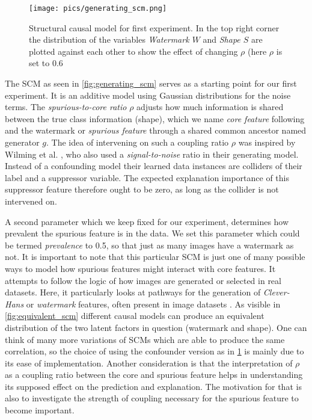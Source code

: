 \begin{figure}[H]
    \centering
    \texttt{[image: pics/generating\_scm.png]}
    \caption{Structural causal model for first experiment.
        In the top right corner the distribution of the variables \textit{Watermark $W$} and \textit{Shape $S$} are plotted against each other to show the effect of changing $\rho$ (here $\rho$ is set to 0.6}
    \label{fig:generating_scm}
\end{figure}

The SCM as seen in \autoref{fig:generating_scm} serves as a starting point for our first experiment. It is an additive model using Gaussian distributions for the noise terms.  The \textit{spurious-to-core ratio} $\rho$ adjusts how much information is shared between the true class information (shape), which we name \textit{core feature} following \cite{Singla2022} and the watermark or \textit{spurious feature} through a shared common ancestor named generator $g$. The idea of intervening on such a coupling ratio $\rho$ was inspired by Wilming et al. \cite{Wilming2023}, who also used a \textit{signal-to-noise} ratio in their generating model. Instead of a confounding model their learned data instances are colliders of their label and a suppressor variable. The expected explanation importance of this suppressor feature therefore ought to be zero, as long as the collider is not intervened on. 

A second parameter which we keep fixed for our experiment, determines how prevalent the spurious feature is in the data. We set this parameter which could be termed \textit{prevalence} to 0.5, so that just as many images have a watermark as not. It is important to note that this particular SCM is just one of many possible ways to model how spurious features might interact with core features. It attempts to follow the logic of how images are generated or selected in real datasets. Here, it particularly looks at pathways for the generation of \textit{Clever-Hans} or \textit{watermark} features, often present in image datasets \cite{Lapuschkin2019}. As visible in \cref{fig:equivalent_scm} different causal models can produce an equivalent distribution of the two latent factors in question (watermark and shape). One can think of many more variations of SCMs which are able to produce the same correlation, so the choice of using the confounder version as in \cref{fig:generating_scm} is mainly due to its ease of implementation. Another consideration is that the interpretation of $\rho$ as a coupling ratio between the core and spurious feature helps in understanding its supposed effect on the prediction and explanation. The motivation for that is also to investigate the strength of coupling necessary for the spurious feature to become important. 

